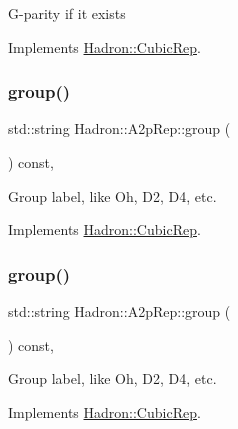 G-\/parity if it exists 

Implements \mbox{\hyperlink{structHadron_1_1CubicRep_a52104e43266d1614c00bbd1c3b395458}{Hadron\+::\+Cubic\+Rep}}.

\mbox{\label{structHadron_1_1A2pRep_a6a7ca57a0cc2ab597b89fb7e07a3cf26}} 
\subsubsection{\texorpdfstring{group()}{group()}\hspace{0.1cm}{\footnotesize\ttfamily [1/3]}}
{\footnotesize\ttfamily std\+::string Hadron\+::\+A2p\+Rep\+::group (\begin{DoxyParamCaption}{ }\end{DoxyParamCaption}) const\hspace{0.3cm}{\ttfamily [inline]}, {\ttfamily [virtual]}}

Group label, like Oh, D2, D4, etc. 

Implements \mbox{\hyperlink{structHadron_1_1CubicRep_a0748f11ec87f387062c8e8981339a29c}{Hadron\+::\+Cubic\+Rep}}.

\mbox{\label{structHadron_1_1A2pRep_a6a7ca57a0cc2ab597b89fb7e07a3cf26}} 
\subsubsection{\texorpdfstring{group()}{group()}\hspace{0.1cm}{\footnotesize\ttfamily [2/3]}}
{\footnotesize\ttfamily std\+::string Hadron\+::\+A2p\+Rep\+::group (\begin{DoxyParamCaption}{ }\end{DoxyParamCaption}) const\hspace{0.3cm}{\ttfamily [inline]}, {\ttfamily [virtual]}}

Group label, like Oh, D2, D4, etc. 

Implements \mbox{\hyperlink{structHadron_1_1CubicRep_a0748f11ec87f387062c8e8981339a29c}{Hadron\+::\+Cubic\+Rep}}.

\mbox{\label{structHadron_1_1A2pRep_a6a7ca57a0cc2ab597b89fb7e07a3cf26}} 
